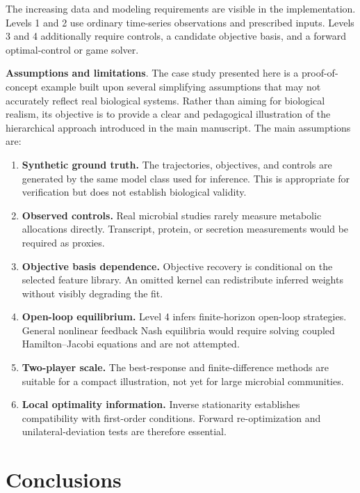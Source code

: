 \documentclass[11pt,a4paper]{article}
\begin{document}
The increasing data and modeling requirements are visible in the implementation. Levels
1 and 2 use ordinary time-series observations and prescribed inputs. Levels 3
and 4 additionally require controls, a candidate objective basis, and a
forward optimal-control or game solver.

\textbf{Assumptions and limitations}. The case study presented here is a proof-of-concept example built upon several simplifying assumptions that may not accurately reflect real biological systems. Rather than aiming for biological realism, its objective is to provide a clear and pedagogical illustration of the hierarchical approach introduced in the main manuscript. The main assumptions are:

\begin{enumerate}
  \item \textbf{Synthetic ground truth.} The trajectories, objectives, and
        controls are generated by the same model class used for inference.
        This is appropriate for verification but does not establish biological
        validity.
  \item \textbf{Observed controls.} Real microbial studies rarely measure
        metabolic allocations directly. Transcript, protein, or secretion
        measurements would be required as proxies.
  \item \textbf{Objective basis dependence.} Objective recovery is conditional
        on the selected feature library. An omitted kernel can redistribute
        inferred weights without visibly degrading the fit.
  \item \textbf{Open-loop equilibrium.} Level 4 infers finite-horizon open-loop
        strategies. General nonlinear feedback Nash equilibria would require
        solving coupled Hamilton--Jacobi equations and are not attempted.
  \item \textbf{Two-player scale.} The best-response and finite-difference
        methods are suitable for a compact illustration, not yet for large
        microbial communities.
  \item \textbf{Local optimality information.} Inverse stationarity establishes
        compatibility with first-order conditions. Forward re-optimization and
        unilateral-deviation tests are therefore essential.
\end{enumerate}


\section{Conclusions}
\end{document}

